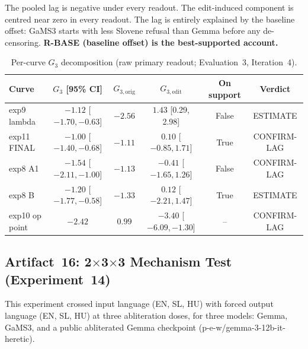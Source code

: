 \documentclass[11pt,letterpaper]{article}
\begin{document}
The pooled lag is negative under every readout. The edit-induced component is centred near zero in every readout. The lag is entirely explained by the baseline offset: GaMS3 starts with less Slovene refusal than Gemma before any de-censoring. \textbf{R-BASE (baseline offset) is the best-supported account.}

\begin{table}[!htbp]
\centering
\caption{Per-curve $G_3$ decomposition (raw primary readout; Evaluation~3, Iteration~4).}
\label{tab:percurve_eval3}
{\small
\begin{tabular}{lccccc}
\toprule
Curve & $G_3$ [95\% CI] & $G_{3,\text{orig}}$ & $G_{3,\text{edit}}$ & On support & Verdict \\
\midrule
exp9 lambda & $-1.12$ [$-1.70, -0.63$] & $-2.56$ & $1.43$ [0.29, 2.98] & False & ESTIMATE \\
exp11 FINAL & $-1.00$ [$-1.40, -0.68$] & $-1.11$ & $0.10$ [$-0.85, 1.71$] & True & CONFIRM-LAG \\
exp8 A1 & $-1.54$ [$-2.11, -1.00$] & $-1.13$ & $-0.41$ [$-1.65, 1.26$] & False & CONFIRM-LAG \\
exp8 B & $-1.20$ [$-1.77, -0.58$] & $-1.33$ & $0.12$ [$-2.21, 1.47$] & True & ESTIMATE \\
exp10 op point & $-2.42$ & $0.99$ & $-3.40$ [$-6.09, -1.30$] & -- & CONFIRM-LAG \\
\bottomrule
\end{tabular}
}
\end{table}


\subsection{Artifact~16: 2$\times$3$\times$3 Mechanism Test (Experiment~14)}
\label{gen_art_experiment_14}

This experiment crossed input language (EN, SL, HU) with forced output language (EN, SL, HU) at three abliteration doses, for three models: Gemma, GaMS3, and a public abliterated Gemma checkpoint (p-e-w/gemma-3-12b-it-heretic).
\end{document}
